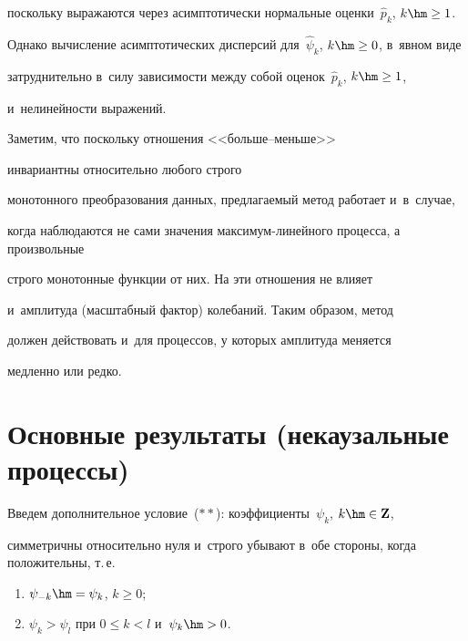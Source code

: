 поскольку выражаются через асимптотически нормальные оценки~${\hat p}_k$, $k\hm\ge 1$.


Однако вычисление асимптотических дисперсий для~${\hat\psi}_k$, $k\hm\ge 0$, в~явном виде


затруднительно в~силу зависимости между собой оценок~${\hat p}_k$, $k\hm\ge 1$, 


и~нелинейности выражений.





Заметим, что поскольку отношения <<боль\-ше--меньш\-е>>


инвариантны относительно любого строго


монотонного преобразования данных, предлагаемый метод работает и~в~случае,


когда наблюдаются не сами значения мак\-си\-мум-ли\-ней\-но\-го процесса, а~ произвольные


строго монотонные функции от них. На эти отношения не влияет 


и~амплитуда (масштабный фактор) колебаний. Таким образом, метод


должен действовать и~для процессов, у которых амплитуда меняется


медленно или редко.





\section{Основные результаты (некаузальные процессы)}





Введем дополнительное условие~($**$): коэффициенты~$\psi_k$, $k\hm\in {\bf Z}$,


симметричны относительно нуля и~строго убывают в~обе стороны, когда положительны, т.\,е.\


\begin{enumerate}[(1)]


\item $\psi_{-k}\hm=\psi_k$, $k\ge 0$;





\item $\psi_k>\psi_l$ при $0\le k<l$ и~$\psi_k\hm>0$.


\end{enumerate}





